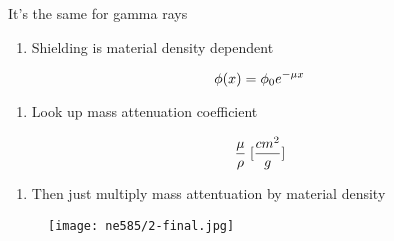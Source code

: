 \documentclass[aspectratio=1610,pdftex,dvipsnames,compress,xcolor={dvipsnames}]{beamer}
\begin{document}
\begin{frame}{It's the same for gamma rays}
    \begin{enumerate}[series=outerlist,topsep=0pt,itemsep=11pt,leftmargin=*,label=(\arabic*)]
        \item[]Shielding is material density dependent
    \end{enumerate}

    \vspace*{\fill}

    \begin{equation}
        \LARGE
        \phi(x) = \phi_0 e^{-\mu x}
    \end{equation}

    \vspace*{\fill}

    \begin{enumerate}[series=outerlist,topsep=0pt,itemsep=11pt,leftmargin=*,label=(\arabic*)]
        \item[]Look up mass attenuation coefficient
    \end{enumerate}

    \vspace*{\fill}

    \begin{equation}
        \LARGE
        \frac{\mu}{\rho} \; [\frac{cm^2}{g}]
    \end{equation}

    \vspace*{\fill}

    \begin{enumerate}[series=outerlist,topsep=0pt,itemsep=11pt,leftmargin=*,label=(\arabic*)]
        \item[]Then just multiply mass attentuation by material density
    \end{enumerate}
\end{frame}


\begin{frame}[plain]{}
    \begin{figure}
        \centering
        \texttt{[image: ne585/2-final.jpg]}
    \end{figure}
\end{frame}
\end{document}
